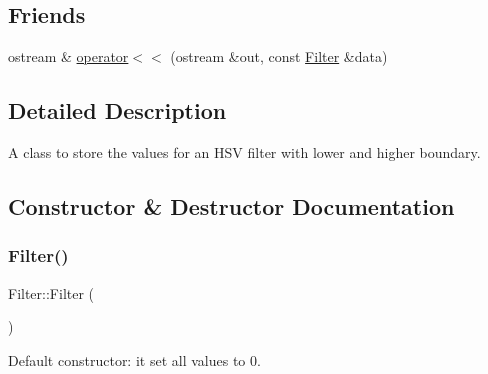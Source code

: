 \subsection*{Friends}
\begin{DoxyCompactItemize}
\item 
ostream \& \mbox{\hyperlink{class_filter_addf23b41f620f3518eeeb97b8bb2c2e1}{operator$<$$<$}} (ostream \&out, const \mbox{\hyperlink{class_filter}{Filter}} \&data)
\end{DoxyCompactItemize}


\subsection{Detailed Description}
A class to store the values for an H\+SV filter with lower and higher boundary. 

\subsection{Constructor \& Destructor Documentation}
\mbox{\label{class_filter_ad15994c30d497afd567a6445446a249e}} 
\subsubsection{\texorpdfstring{Filter()}{Filter()}\hspace{0.1cm}{\footnotesize\ttfamily [1/3]}}
{\footnotesize\ttfamily Filter\+::\+Filter (\begin{DoxyParamCaption}{ }\end{DoxyParamCaption})\hspace{0.3cm}{\ttfamily [inline]}}



Default constructor\+: it set all values to 0. 

\mbox{\label{class_filter_a75b792236ffdb9590eb762e2a82802a5}} 
